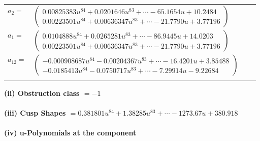 \documentclass[1p]{elsarticle_modified}
\theoremstyle{definition}
\begin{document}
\begin{tabular}{m{7pt} m{180pt} m{7pt} m{180pt} }
\flushright $a_{2}=$&$\begin{pmatrix}0.00825383 u^{84}+0.0201646 u^{83}+\cdots-65.1654 u+10.2484\\0.00223501 u^{84}+0.00636347 u^{83}+\cdots-21.7790 u+3.77196\end{pmatrix}$ \\
\flushright $a_{1}=$&$\begin{pmatrix}0.0104888 u^{84}+0.0265281 u^{83}+\cdots-86.9445 u+14.0203\\0.00223501 u^{84}+0.00636347 u^{83}+\cdots-21.7790 u+3.77196\end{pmatrix}$ \\
\flushright $a_{12}=$&$\begin{pmatrix}-0.000908687 u^{84}-0.00204367 u^{83}+\cdots-16.4201 u+3.85488\\-0.0185413 u^{84}-0.0750717 u^{83}+\cdots-7.29914 u-9.22684\end{pmatrix}$\\&\end{tabular}
\flushleft \textbf{(ii) Obstruction class $= -1$}\\~\\
\flushleft \textbf{(iii) Cusp Shapes $= 0.381801 u^{84}+1.38285 u^{83}+\cdots-1273.67 u+380.918$}\\~\\
\newpage\renewcommand{\arraystretch}{1}
\flushleft \textbf{(iv) u-Polynomials at the component}\newline \\
\end{document}
